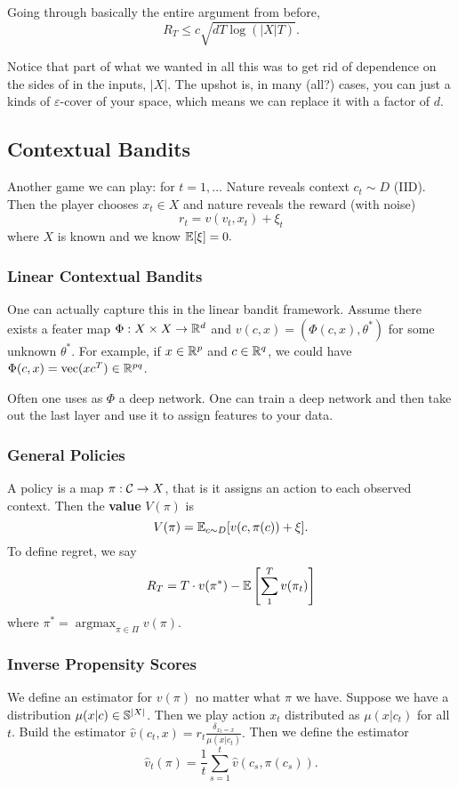 \documentclass[12pt]{article}
\DeclareMathOperator*{\argmax}{argmax}
\begin{document}
Going through basically the entire argument from before,
\[R_T\le c\sqrt{dT\log(|X|T)}.\]
\begin{rmk}
	Notice that part of what we wanted in all this was to get rid of dependence on the sides of in the inputs, $|X|$. The upshot is, in many (all?) cases, you can just a kinds of $\varepsilon$-cover of your space, which means we can replace it with a factor of $d$.
\end{rmk}

\subsection{Contextual Bandits}
Another game we can play: for $t=1,\dots$ Nature reveals context $c_t\sim D$ (IID). Then the player chooses $x_t\in X$ and nature reveals the reward (with noise)
\[r_t=v(v_t,x_t)+\xi_t\]
where $X$ is known and we know $\mathbb{E}[\xi]=0.$

\subsubsection{Linear Contextual Bandits}
One can actually capture this in the linear bandit framework. Assume there exists a feater map $\Phi:X\times X\to \mathbb{R}^d$ and $v(c,x)=(\Phi(c,x),\theta^\ast)$ for some unknown $\theta^\ast$.
For example, if $x\in\mathbb{R}^p$ and $c\in\mathbb{R}^q$, we could have $\Phi(c,x)=\operatorname{vec}(xc^T)\in\mathbb{R}^{pq}$.
\begin{rmk}
	Often one uses as $\Phi$ a deep network. One can train a deep network and then take out the last layer and use it to assign features to your data.
\end{rmk}
\subsubsection{General Policies}
A policy is a map $\pi:\mathcal{C}\to X$, that is it assigns an action to each observed context. Then the \textbf{value} $V(\pi)$ is 
\[V(\pi)=\mathbb{E}_{c\sim D}[v(c,\pi(c))+\xi].\]
To define regret, we say 
\[R_T=T\cdot v(\pi^\ast)-\mathbb{E}\left[\sum_1^T v(\pi_t)\right]\]
where $\pi^\ast=\argmax_{\pi\in\Pi}v(\pi)$.
\subsubsection{Inverse Propensity Scores}
We define an estimator for $v(\pi)$ no matter what $\pi$ we have. Suppose we have a distribution $\mu(x|c)\in\mathbb{S}^{|X|}$. Then we play action $x_t$ distributed as $\mu(x|c_t)$ for all $t$.
Build the estimator $\hat v(c_t,x)=r_t\frac{\delta_{x_t=x}}{\mu(x|c_t)}.$ Then we define the estimator 
\[\hat v_t(\pi)=\frac{1}{t}\sum_{s=1}^t\hat v(c_s,\pi(c_s)).\]
\end{document}
